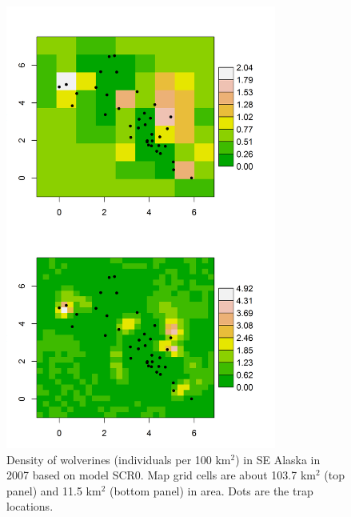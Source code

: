 {\begin{figure}
\begin{center}
\includegraphics[height=5.75in,width=3.5in]{Ch4-SCR0/figs/wolvDensity}
\end{center}
\caption{Density of wolverines (individuals per 100 km$^2$) in SE Alaska in 2007 based on
  model SCR0. Map grid cells are about 103.7 km$^2$ (top panel) and
11.5 km$^2$ (bottom panel) in area. Dots are the trap locations.}
\label{scr0.fig.density}
\end{figure}



}
